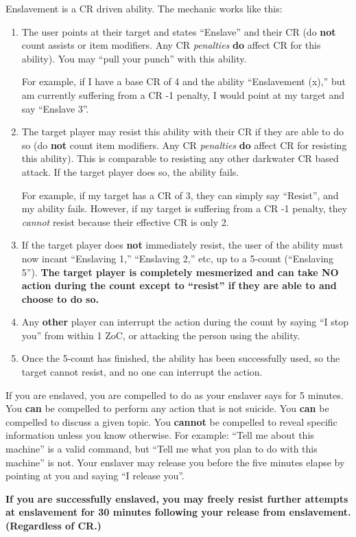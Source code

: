 \documentclass[green]{elementals}
\begin{document}
\name{\gEnslave{}} 

Enslavement is a CR driven ability. The mechanic works like this:

\begin{enumerate}
 \item The user points at their target and states ``Enslave'' and their CR (do {\bf not} count assists or item modifiers. Any CR \emph{penalties} {\bf do} affect CR for this ability). You may ``pull your punch'' with this ability. 
 
 For example, if I have a base CR of 4 and the ability ``Enslavement (x),'' but am currently suffering from a CR -1 penalty, I would point at my target and say ``Enslave 3''. 
 
 \item The target player may resist this ability with their CR if they are able to do so (do {\bf not} count item modifiers. Any CR \emph{penalties} {\bf do} affect CR for resisting this ability). This is comparable to resisting any other darkwater CR based attack. If the target player does so, the ability fails. 
 
 For example, if my target has a CR of 3, they can simply say ``Resist'', and my ability fails.
 However, if my target is suffering from a CR -1 penalty, they \emph{cannot} resist because their effective CR is only 2.
 
 \item If the target player does {\bf not} immediately resist, the user of the ability must now incant ``Enslaving 1,'' ``Enslaving 2,'' etc, up to a 5-count (``Enslaving 5''). {\bf The target player is completely mesmerized and can take NO action during the count except to ``resist'' if they are able to and choose to do so.}
 
 \item Any {\bf other} player can interrupt the action during the count by saying ``I stop you'' from within 1 ZoC, or attacking the person using the ability.
 
 \item Once the 5-count has finished, the ability has been successfully used, so the target cannot resist, and no one can interrupt the action.
\end{enumerate}

If you are enslaved, you are compelled to do as your enslaver says for 5 minutes. You {\bf can} be compelled to perform any action that is not suicide. You {\bf can} be compelled  to discuss a given topic. You {\bf cannot} be compelled to reveal specific information unless you know otherwise. For example: ``Tell me about this machine'' is a valid command, but ``Tell me what you plan to do with this machine'' is not. Your enslaver may release you before the five minutes elapse by pointing at you and saying ``I release you''.

{\bf If you are successfully enslaved, you may freely resist further attempts at enslavement for 30 minutes following your release from enslavement. (Regardless of CR.)}
\end{document}
